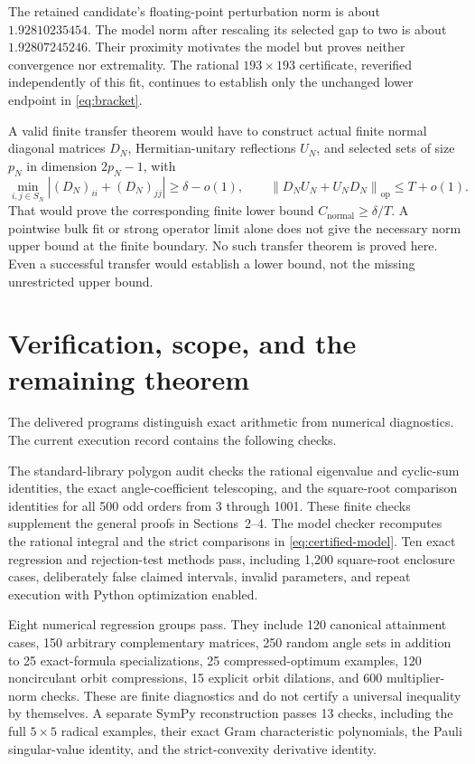 \documentclass[11pt]{article}
\theoremstyle{remark}
\newcommand{\op}{\mathrm{op}}
\newcommand{\norm}[1]{\left\lVert#1\right\rVert_{\op}}
\newcommand{\Cstar}{C_{\mathrm{normal}}}
\begin{document}
The retained candidate's floating-point perturbation norm is about $1.92810235454$. The model norm after rescaling its selected gap to two is about $1.92807245246$. Their proximity motivates the model but proves neither convergence nor extremality. The rational $193\times193$ certificate, reverified independently of this fit, continues to establish only the unchanged lower endpoint in \eqref{eq:bracket}.

A valid finite transfer theorem would have to construct actual finite normal diagonal matrices $D_N$, Hermitian-unitary reflections $U_N$, and selected sets of size $p_N$ in dimension $2p_N-1$, with
\[
 \min_{i,j\in S_N}|(D_N)_{ii}+(D_N)_{jj}|\ge\delta-o(1),
 \qquad \norm{D_NU_N+U_ND_N}\le T+o(1).
\]
That would prove the corresponding finite lower bound $\Cstar\ge\delta/T$. A pointwise bulk fit or strong operator limit alone does not give the necessary norm upper bound at the finite boundary. No such transfer theorem is proved here. Even a successful transfer would establish a lower bound, not the missing unrestricted upper bound.

\section{Verification, scope, and the remaining theorem}
The delivered programs distinguish exact arithmetic from numerical diagnostics. The current execution record contains the following checks.

The standard-library polygon audit checks the rational eigenvalue and cyclic-sum identities, the exact angle-coefficient telescoping, and the square-root comparison identities for all 500 odd orders from 3 through 1001. These finite checks supplement the general proofs in Sections~2--4. The model checker recomputes the rational integral and the strict comparisons in \eqref{eq:certified-model}. Ten exact regression and rejection-test methods pass, including 1,200 square-root enclosure cases, deliberately false claimed intervals, invalid parameters, and repeat execution with Python optimization enabled.

Eight numerical regression groups pass. They include 120 canonical attainment cases, 150 arbitrary complementary matrices, 250 random angle sets in addition to 25 exact-formula specializations, 25 compressed-optimum examples, 120 noncirculant orbit compressions, 15 explicit orbit dilations, and 600 multiplier-norm checks. These are finite diagnostics and do not certify a universal inequality by themselves. A separate SymPy reconstruction passes 13 checks, including the full $5\times5$ radical examples, their exact Gram characteristic polynomials, the Pauli singular-value identity, and the strict-convexity derivative identity.
\end{document}
